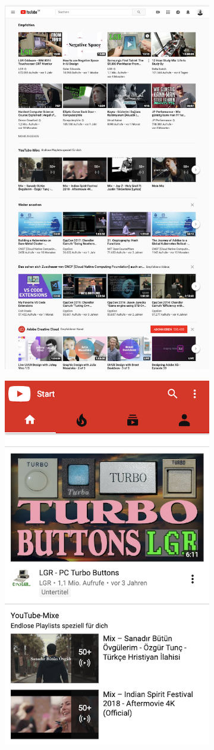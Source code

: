 \begin{figure}
	\centering
	\begin{subfigure}{0.6\textwidth}
		\centering
		\includegraphics[width=0.5\linewidth]{resources/screenshot_resolution}
		\caption{}
		\label{compare_resolution}
	\end{subfigure}%
	\begin{subfigure}{0.6\textwidth}
		\centering
		\includegraphics[width=0.5\linewidth]{resources/screenshot_resolutionanduseragent}

\end{subfigure}
\end{figure}
